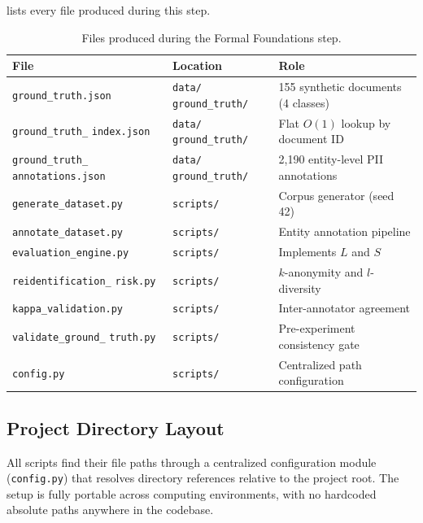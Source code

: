 \documentclass[12pt, a4paper]{article}
\begin{document}
 lists every file produced during this step.

\begin{table}[H]
\centering
\caption{Files produced during the Formal Foundations step.}
\label{tab:deliverables}
\scriptsize
\setlength{\tabcolsep}{3pt}
\begin{tabular}{L{3.3cm} L{2.2cm} L{6.6cm}}
\toprule
{}
\color{white}\textbf{File} &
\color{white}\textbf{Location} &
\color{white}\textbf{Role} \\
\midrule
\texttt{ground\_truth.json}           & \texttt{data/} \texttt{ground\_truth/} & 155 synthetic documents (4 classes) \\
\texttt{ground\_truth\_} \texttt{index.json} & \texttt{data/} \texttt{ground\_truth/} & Flat $O(1)$ lookup by document ID \\
\texttt{ground\_truth\_} \texttt{annotations.json} & \texttt{data/} \texttt{ground\_truth/} & 2{,}190 entity-level PII annotations \\
\texttt{generate\_dataset.py}         & \texttt{scripts/}  & Corpus generator (seed 42) \\
\texttt{annotate\_dataset.py}         & \texttt{scripts/}  & Entity annotation pipeline \\
\texttt{evaluation\_engine.py}        & \texttt{scripts/}  & Implements $L$ and $S$ \\
\texttt{reidentification\_} \texttt{risk.py} & \texttt{scripts/}  & $k$-anonymity and $l$-diversity \\
\texttt{kappa\_validation.py}         & \texttt{scripts/}  & Inter-annotator agreement \\
\texttt{validate\_ground\_} \texttt{truth.py} & \texttt{scripts/}  & Pre-experiment consistency gate \\
\texttt{config.py}                         & \texttt{scripts/}           & Centralized path configuration \\
\bottomrule
\end{tabular}
\setlength{\tabcolsep}{6pt}
\end{table}

\subsection{Project Directory Layout}

All scripts find their file paths through a centralized configuration module (\texttt{config.py}) that resolves directory references relative to the project root. The setup is fully portable across computing environments, with no hardcoded absolute paths anywhere in the codebase.
\end{document}
